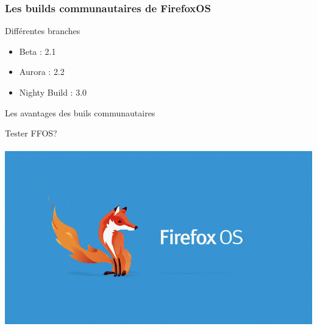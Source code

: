 \documentclass{beamer}
\begin{document}
\begin{frame}
\frametitle{Les builds communautaires de FirefoxOS}


\begin{block}{Différentes branches}
\begin{itemize}
\item Beta : 2.1
\item Aurora : 2.2
\item Nighty Build : 3.0
\end{itemize}
\end{block}

\begin{block}{Les avantages des buils communautaires}
\end{block}
\end{frame}
\begin{frame}
\begin{center}
\Huge{Tester FFOS?}
\\~\\
\includegraphics[scale=0.3]{./images/firefox-os.jpg}
\end{center}
\end{frame}
\end{document}
